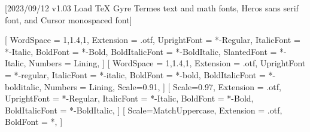 
[2023/09/12 v1.03 Load TeX Gyre Termes text and math fonts, Heros sans
serif font, and Cursor monospaced font]

%
%
\ifpdftex
{}
\RequirePackage[T1]{fontenc}
\RequirePackage{bm}
\else
{}
\RequirePackage[warnings-off={mathtools-colon,mathtools-overbracket}]{unicode-math}
%
\setmainfont{TeXGyreTermesX}[%
  WordSpace = {1,1.4,1},
  Extension = .otf,
  UprightFont = *-Regular,
  ItalicFont = *-Italic,
  BoldFont = *-Bold,
  BoldItalicFont = *-BoldItalic,
  SlantedFont = *-Italic,
  Numbers = Lining,
]
\setsansfont{texgyreheros}[%
  WordSpace = {1,1.4,1},
  Extension = .otf,
  UprightFont = *-regular,
  ItalicFont = *-italic,
  BoldFont = *-bold,
  BoldItalicFont = *-bolditalic,
  Numbers = Lining,
  Scale=0.91,%
]
\setmonofont{texgyrecursor}[%
  Scale=0.97,
  Extension = .otf,
  UprightFont = *-Regular,
  ItalicFont = *-Italic,
  BoldFont = *-Bold,
  BoldItalicFont = *-BoldItalic,
]
[%
  Scale=MatchUppercase,
  Extension = .otf,
  BoldFont = *, %
]
%
\newcommand*{\FRAC}[1]{{\addfontfeature{Fractions=On}#1}}%
\fi
